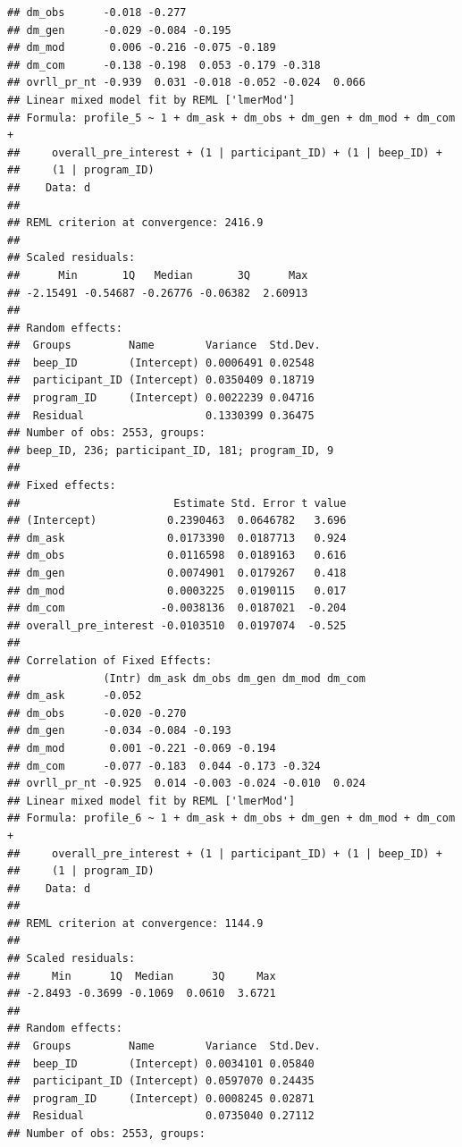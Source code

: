 \documentclass[]{msu-thesis}
\theoremstyle{definition}
\theoremstyle{definition}
\theoremstyle{definition}
\theoremstyle{remark}
\begin{document}
\begin{verbatim}
## dm_obs      -0.018 -0.277                            
## dm_gen      -0.029 -0.084 -0.195                     
## dm_mod       0.006 -0.216 -0.075 -0.189              
## dm_com      -0.138 -0.198  0.053 -0.179 -0.318       
## ovrll_pr_nt -0.939  0.031 -0.018 -0.052 -0.024  0.066
## Linear mixed model fit by REML ['lmerMod']
## Formula: profile_5 ~ 1 + dm_ask + dm_obs + dm_gen + dm_mod + dm_com +  
##     overall_pre_interest + (1 | participant_ID) + (1 | beep_ID) +  
##     (1 | program_ID)
##    Data: d
## 
## REML criterion at convergence: 2416.9
## 
## Scaled residuals: 
##      Min       1Q   Median       3Q      Max 
## -2.15491 -0.54687 -0.26776 -0.06382  2.60913 
## 
## Random effects:
##  Groups         Name        Variance  Std.Dev.
##  beep_ID        (Intercept) 0.0006491 0.02548 
##  participant_ID (Intercept) 0.0350409 0.18719 
##  program_ID     (Intercept) 0.0022239 0.04716 
##  Residual                   0.1330399 0.36475 
## Number of obs: 2553, groups:  
## beep_ID, 236; participant_ID, 181; program_ID, 9
## 
## Fixed effects:
##                        Estimate Std. Error t value
## (Intercept)           0.2390463  0.0646782   3.696
## dm_ask                0.0173390  0.0187713   0.924
## dm_obs                0.0116598  0.0189163   0.616
## dm_gen                0.0074901  0.0179267   0.418
## dm_mod                0.0003225  0.0190115   0.017
## dm_com               -0.0038136  0.0187021  -0.204
## overall_pre_interest -0.0103510  0.0197074  -0.525
## 
## Correlation of Fixed Effects:
##             (Intr) dm_ask dm_obs dm_gen dm_mod dm_com
## dm_ask      -0.052                                   
## dm_obs      -0.020 -0.270                            
## dm_gen      -0.034 -0.084 -0.193                     
## dm_mod       0.001 -0.221 -0.069 -0.194              
## dm_com      -0.077 -0.183  0.044 -0.173 -0.324       
## ovrll_pr_nt -0.925  0.014 -0.003 -0.024 -0.010  0.024
## Linear mixed model fit by REML ['lmerMod']
## Formula: profile_6 ~ 1 + dm_ask + dm_obs + dm_gen + dm_mod + dm_com +  
##     overall_pre_interest + (1 | participant_ID) + (1 | beep_ID) +  
##     (1 | program_ID)
##    Data: d
## 
## REML criterion at convergence: 1144.9
## 
## Scaled residuals: 
##     Min      1Q  Median      3Q     Max 
## -2.8493 -0.3699 -0.1069  0.0610  3.6721 
## 
## Random effects:
##  Groups         Name        Variance  Std.Dev.
##  beep_ID        (Intercept) 0.0034101 0.05840 
##  participant_ID (Intercept) 0.0597070 0.24435 
##  program_ID     (Intercept) 0.0008245 0.02871 
##  Residual                   0.0735040 0.27112 
## Number of obs: 2553, groups:  

\end{verbatim}
\end{document}
